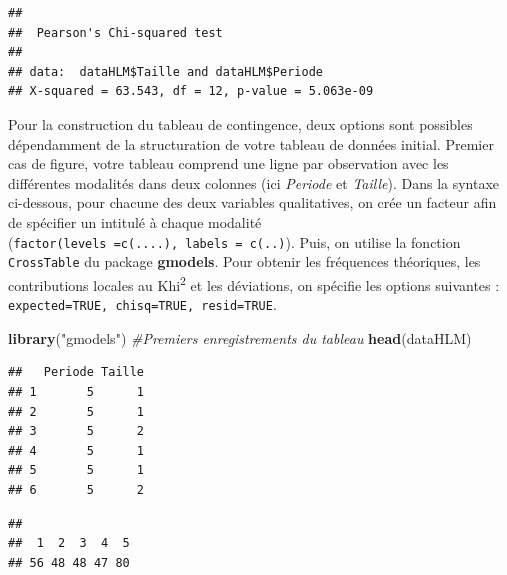 \documentclass[
  11pt,
  french,
]{book}
\makeatletter
\newenvironment{Shaded}{\begin{snugshade}}{\end{snugshade}}
\newcommand{\CommentTok}[1]{\textcolor[rgb]{0.56,0.35,0.01}{\textit{#1}}}
\newcommand{\KeywordTok}[1]{\textcolor[rgb]{0.13,0.29,0.53}{\textbf{#1}}}
\newcommand{\NormalTok}[1]{#1}
\newcommand{\OperatorTok}[1]{\textcolor[rgb]{0.81,0.36,0.00}{\textbf{#1}}}
\newcommand{\StringTok}[1]{\textcolor[rgb]{0.31,0.60,0.02}{#1}}
\newenvironment{kframe}{%
\medskip{}
\setlength{\fboxsep}{.8em}
 \def\at@end@of@kframe{}%
 \ifinner\ifhmode%
  \def\at@end@of@kframe{\end{minipage}}%
  \begin{minipage}{\columnwidth}%
 \fi\fi%
 \def\FrameCommand##1{\hskip\@totalleftmargin \hskip-\fboxsep
 \colorbox{shadecolor}{##1}\hskip-\fboxsep
     \hskip-\linewidth \hskip-\@totalleftmargin \hskip\columnwidth}%
 \MakeFramed {\advance\hsize-\width
   \@totalleftmargin\z@ \linewidth\hsize
   \@setminipage}}%
 {\par\unskip\endMakeFramed%
 \at@end@of@kframe}
\renewenvironment{Shaded}{\begin{kframe}}{\end{kframe}}
\makeatother
\begin{document}
\begin{verbatim}
## 
## 	Pearson's Chi-squared test
## 
## data:  dataHLM$Taille and dataHLM$Periode
## X-squared = 63.543, df = 12, p-value = 5.063e-09
\end{verbatim}

Pour la construction du tableau de contingence, deux options sont possibles dépendamment de la structuration de votre tableau de données initial. Premier cas de figure, votre tableau comprend une ligne par observation avec les différentes modalités dans deux colonnes (ici \emph{Periode} et \emph{Taille}). Dans la syntaxe ci-dessous, pour chacune des deux variables qualitatives, on crée un facteur afin de spécifier un intitulé à chaque modalité (\texttt{factor(levels\ =c(....),\ labels\ =\ c(..)}). Puis, on utilise la fonction \texttt{CrossTable} du package \textbf{gmodels}. Pour obtenir les fréquences théoriques, les contributions locales au Khi\textsuperscript{2} et les déviations, on spécifie les options suivantes : \texttt{expected=TRUE,\ chisq=TRUE,\ resid=TRUE}.

\begin{Shaded}
\begin{Highlighting}[]
\KeywordTok{library}\NormalTok{(}\StringTok{"gmodels"}\NormalTok{)}
\CommentTok{#Premiers enregistrements du tableau}
\KeywordTok{head}\NormalTok{(dataHLM)}
\end{Highlighting}
\end{Shaded}

\begin{verbatim}
##   Periode Taille
## 1       5      1
## 2       5      1
## 3       5      2
## 4       5      1
## 5       5      1
## 6       5      2
\end{verbatim}

\begin{Shaded}
\end{Shaded}

\begin{verbatim}
## 
##  1  2  3  4  5 
## 56 48 48 47 80
\end{verbatim}

\begin{Shaded}
\end{Shaded}
\end{document}
